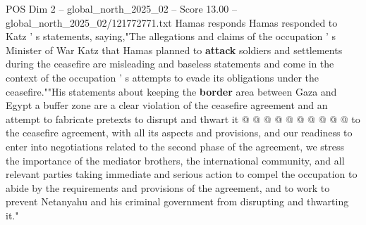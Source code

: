 \begin{textsample}{POS Dim 2 – global\_north\_2025\_02 – Score 13.00 – global\_north\_2025\_02/121772771.txt}
Hamas responds Hamas responded to Katz ' s statements, saying,"The allegations and claims of the occupation ' s Minister of War Katz that Hamas planned to \textbf{attack} soldiers and settlements during the ceasefire are misleading and baseless statements and come in the context of the occupation ' s attempts to evade its obligations under the ceasefire.""His statements about keeping the \textbf{border} area between Gaza and Egypt a buffer zone are a clear violation of the ceasefire agreement and an attempt to fabricate pretexts to disrupt and thwart it @ @ @ @ @ @ @ @ @ @ to the ceasefire agreement, with all its aspects and provisions, and our readiness to enter into negotiations related to the second phase of the agreement, we stress the importance of the mediator brothers, the international community, and all relevant parties taking immediate and serious action to compel the occupation to abide by the requirements and provisions of the agreement, and to work to prevent Netanyahu and his criminal government from disrupting and thwarting it."

\end{textsample}
